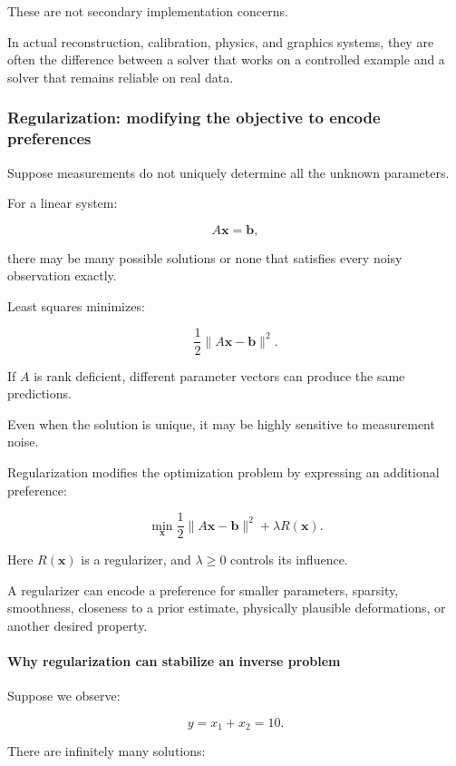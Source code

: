 These are not secondary implementation concerns.

In actual reconstruction, calibration, physics, and graphics systems, they are often the difference between a solver that works on a controlled example and a solver that remains reliable on real data.

\subsubsection{Regularization: modifying the objective to encode preferences}\label{02-foundations-ii-ch027-regularization-modifying-the-objective-to-encode-preferences}

Suppose measurements do not uniquely determine all the unknown parameters.

For a linear system:

\[
A\mathbf x=\mathbf b,
\]

there may be many possible solutions or none that satisfies every noisy observation exactly.

Least squares minimizes:

\[
\frac12\|A\mathbf x-\mathbf b\|^2.
\]

If \(A\) is rank deficient, different parameter vectors can produce the same predictions.

Even when the solution is unique, it may be highly sensitive to measurement noise.

Regularization modifies the optimization problem by expressing an additional preference:

\[
\boxed{ \min_{\mathbf x} \frac12\|A\mathbf x-\mathbf b\|^2 + \lambda R(\mathbf x) }.
\]

Here \(R(\mathbf x)\) is a regularizer, and \(\lambda\ge0\) controls its influence.

A regularizer can encode a preference for smaller parameters, sparsity, smoothness, closeness to a prior estimate, physically plausible deformations, or another desired property.

\paragraph{Why regularization can stabilize an inverse problem}\label{02-foundations-ii-ch027-why-regularization-can-stabilize-an-inverse-problem}

Suppose we observe:

\[
y=x_1+x_2=10.
\]

There are infinitely many solutions:

